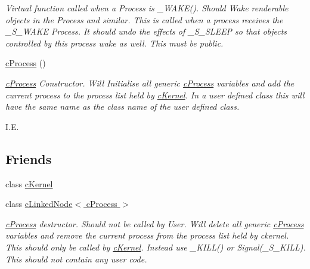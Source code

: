 \begin{DoxyCompactItemize}
\begin{DoxyCompactList}\small\item\em Virtual function called when a Process is \_\-WAKE(). Should Wake renderable objects in the Process and similar. This is called when a process receives the \_\-S\_\-WAKE Process. It should undo the effects of \_\-S\_\-SLEEP so that objects controlled by this process wake as well. This must be public. \end{DoxyCompactList}\item 
\hyperlink{classc_process_aacef3df3ad7e22197c4360c4b791f2e1}{cProcess} ()
\begin{DoxyCompactList}\small\item\em \hyperlink{classc_process}{cProcess} Constructor. Will Initialise all generic \hyperlink{classc_process}{cProcess} variables and add the current process to the process list held by \hyperlink{classc_kernel}{cKernel}. In a user defined class this will have the same name as the class name of the user defined class. \par
 I.E. \end{DoxyCompactList}\end{DoxyCompactItemize}
\subsection*{Friends}
\begin{DoxyCompactItemize}
\item 
\hypertarget{classc_process_ad3a3477f115d2be6d39a69bdff272ca5}{
class \hyperlink{classc_process_ad3a3477f115d2be6d39a69bdff272ca5}{cKernel}}
\label{classc_process_ad3a3477f115d2be6d39a69bdff272ca5}

\item 
\hypertarget{classc_process_a2cba6e2ae7f78602e68baab0f91b26a1}{
class \hyperlink{classc_process_a2cba6e2ae7f78602e68baab0f91b26a1}{cLinkedNode$<$ cProcess $>$}}
\label{classc_process_a2cba6e2ae7f78602e68baab0f91b26a1}

\begin{DoxyCompactList}\small\item\em \hyperlink{classc_process}{cProcess} destructor. Should not be called by User. Will delete all generic \hyperlink{classc_process}{cProcess} variables and remove the current process from the process list held by ckernel. This should only be called by \hyperlink{classc_kernel}{cKernel}. Instead use \_\-KILL() or Signal(\_\-S\_\-KILL). This should not contain any user code. \end{DoxyCompactList}\end{DoxyCompactItemize}


